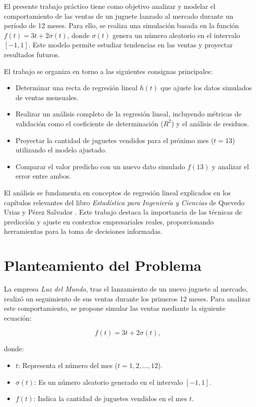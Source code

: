 \documentclass[a4paper,12pt]{article}
\begin{document}
El presente trabajo práctico tiene como objetivo analizar y modelar el comportamiento de las ventas de un juguete lanzado al mercado durante un período de 12 meses. Para ello, se realiza una simulación basada en la función \( f(t) = 3t + 2\sigma(t) \), donde \( \sigma(t) \) genera un número aleatorio en el intervalo \([-1,1]\). Este modelo permite estudiar tendencias en las ventas y proyectar resultados futuros.

El trabajo se organiza en torno a las siguientes consignas principales:
\begin{itemize}
    \item Determinar una recta de regresión lineal \( h(t) \) que ajuste los datos simulados de ventas mensuales.
    \item Realizar un análisis completo de la regresión lineal, incluyendo métricas de validación como el coeficiente de determinación (\( R^2 \)) y el análisis de residuos.
    \item Proyectar la cantidad de juguetes vendidos para el próximo mes (\( t = 13 \)) utilizando el modelo ajustado.
    \item Comparar el valor predicho con un nuevo dato simulado \( f(13) \) y analizar el error entre ambos.
\end{itemize}

El análisis se fundamenta en conceptos de regresión lineal explicados en los capítulos relevantes del libro \textit{Estadística para Ingeniería y Ciencias} de Quevedo Urias y Pérez Salvador \cite{quevedo2009}. Este trabajo destaca la importancia de las técnicas de predicción y ajuste en contextos empresariales reales, proporcionando herramientas para la toma de decisiones informadas.

\section{Planteamiento del Problema}

La empresa \textit{Luz del Mundo}, tras el lanzamiento de un nuevo juguete al mercado, realizó un seguimiento de sus ventas durante los primeros 12 meses. Para analizar este comportamiento, se propone simular las ventas mediante la siguiente ecuación:

\[
f(t) = 3t + 2\sigma(t),
\]

donde:
\begin{itemize}
    \item \( t \): Representa el número del mes (\( t = 1, 2, \ldots, 12 \)).
    \item \( \sigma(t) \): Es un número aleatorio generado en el intervalo \([-1,1]\).
    \item \( f(t) \): Indica la cantidad de juguetes vendidos en el mes \( t \).
\end{itemize}
\end{document}

